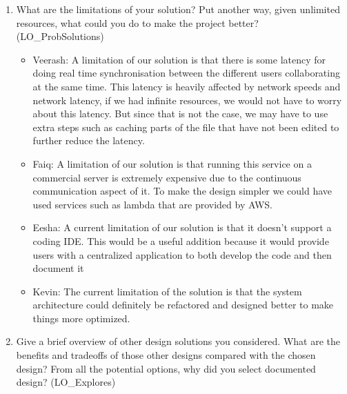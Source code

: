 \documentclass[12pt, titlepage]{article}
\begin{document}
	\begin{enumerate}
		\item What are the limitations of your solution?  Put another way, given
		unlimited resources, what could you do to make the project better? (LO\_ProbSolutions)
		
		\begin{itemize}
			\item Veerash: A limitation of our solution is that there is some latency for doing real time synchronisation between the different users collaborating at the same time. This latency is heavily affected by network speeds and network latency, if we had infinite resources, we would not have to worry about this latency. But since that is not the case, we may have to use extra steps such as caching parts of the file that have not been edited to further reduce the latency.
			\item Faiq: A limitation of our solution is that running this service on a commercial server is extremely expensive due to the continuous communication aspect of it. To make the design simpler we could have used services such as lambda that are provided by AWS.
			\item Eesha: A current limitation of our solution is that it doesn't support a coding IDE. This would be a useful addition because it would provide users with a centralized application to both develop the code and then document it
			\item Kevin: The current limitation of the solution is that the system architecture could definitely be refactored and designed better to make things more optimized. 
			
		\end{itemize}
		
		
		\item Give a brief overview of other design solutions you considered.  What
		are the benefits and tradeoffs of those other designs compared with the chosen
		design?  From all the potential options, why did you select documented design?
		(LO\_Explores)
		

\end{enumerate}
\end{document}
